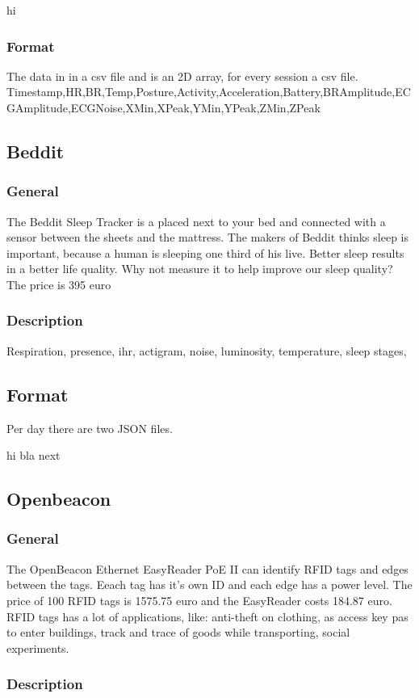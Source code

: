 			hi
		\subsubsection{Format}
		The data in in a csv file and is an 2D array, for every session a csv file.
		Timestamp,HR,BR,Temp,Posture,Activity,Acceleration,Battery,BRAmplitude,ECGAmplitude,ECGNoise,XMin,XPeak,YMin,YPeak,ZMin,ZPeak
	\subsection{Beddit}
		\subsubsection{General}
			The Beddit Sleep Tracker is a placed next to your bed and connected with a sensor between the sheets and the mattress. The makers of Beddit thinks sleep is important, because a human is sleeping one third of his live. Better sleep results in a better life quality. Why not measure it to help improve our sleep quality? 
			The price is 395 euro
			\subsubsection{Description}
				Respiration, presence, ihr, actigram, noise, luminosity, temperature, sleep stages, 
			\subsection{Format}
			Per day there are two JSON files.
			\begin{algorithm}
				\SetAlgoLined
				hi\;
				bla next
			\end{algorithm}
	\subsection{Openbeacon}
		\subsubsection{General}
			The OpenBeacon Ethernet EasyReader PoE II can identify RFID tags and edges between the tags. Eeach tag has it's own ID and each edge has a power level. The price of 100 RFID tags is 1575.75 euro and the EasyReader costs 184.87 euro. RFID tags has a lot of applications, like: anti-theft on clothing, as access key pas to enter buildings, track and trace of goods while transporting, social experiments.
		\subsubsection{Description}

